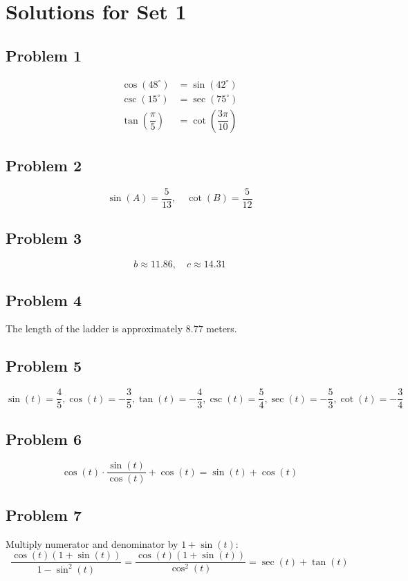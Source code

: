 \documentclass[12pt]{article}
\begin{document}
\newpage
\section*{Solutions for Set 1}
\subsection*{Problem 1}
\begin{align*}
    \cos(48^{\circ}) &= \sin(42^{\circ}) \\
    \csc(15^{\circ}) &= \sec(75^{\circ}) \\
    \tan\left(\dfrac{\pi}{5}\right) &= \cot\left(\dfrac{3\pi}{10}\right)
\end{align*}

\subsection*{Problem 2}
\[
\sin(A) = \dfrac{5}{13}, \quad \cot(B) = \dfrac{5}{12}
\]

\subsection*{Problem 3}
\[
b \approx 11.86, \quad c \approx 14.31
\]

\subsection*{Problem 4}
The length of the ladder is approximately \(8.77\) meters.

\subsection*{Problem 5}
\[
\sin(t) = \dfrac{4}{5}, \cos(t) = -\dfrac{3}{5}, \tan(t) = -\dfrac{4}{3}, \csc(t) = \dfrac{5}{4}, \sec(t) = -\dfrac{5}{3}, \cot(t) = -\dfrac{3}{4}
\]

\subsection*{Problem 6}
\[
\cos(t) \cdot \dfrac{\sin(t)}{\cos(t)} + \cos(t) = \sin(t) + \cos(t)
\]

\subsection*{Problem 7}
Multiply numerator and denominator by \(1 + \sin(t)\):
\[
\dfrac{\cos(t)(1 + \sin(t))}{1 - \sin^2(t)} = \dfrac{\cos(t)(1 + \sin(t))}{\cos^2(t)} = \sec(t) + \tan(t)
\]
\end{document}
